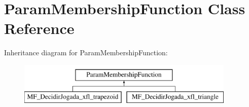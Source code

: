 \hypertarget{classParamMembershipFunction}{
\section{ParamMembershipFunction Class Reference}
\label{classParamMembershipFunction}
}
Inheritance diagram for ParamMembershipFunction:\begin{figure}[H]
\begin{center}
\leavevmode
\includegraphics[height=2.000000cm]{classParamMembershipFunction}
\end{center}
\end{figure}
